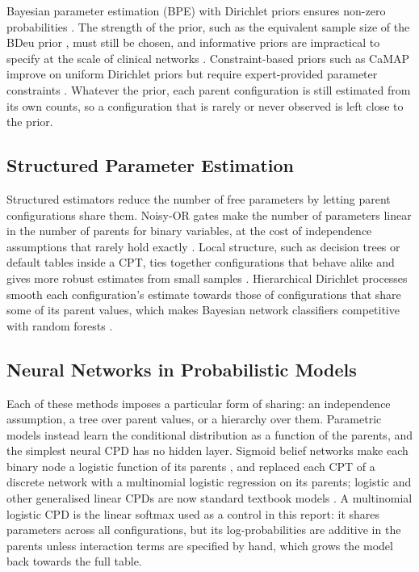 \documentclass[a4paper,fleqn]{cas-dc}
\begin{document}
Bayesian parameter estimation (BPE) with Dirichlet priors ensures non-zero probabilities \citep[Secs.~17.3--17.4]{koller2009probabilistic}. The strength of the prior, such as the equivalent sample size of the BDeu prior \citep{heckerman1995learning}, must still be chosen, and informative priors are impractical to specify at the scale of clinical networks \citep{comprehensive_kyrimi_2021}. Constraint-based priors such as CaMAP improve on uniform Dirichlet priors but require expert-provided parameter constraints \citep{constrained_di_2021}. Whatever the prior, each parent configuration is still estimated from its own counts, so a configuration that is rarely or never observed is left close to the prior.

\subsection{Structured Parameter Estimation}

Structured estimators reduce the number of free parameters by letting parent configurations share them. Noisy-OR gates make the number of parameters linear in the number of parents for binary variables, at the cost of independence assumptions that rarely hold exactly \citep{learning_oniko_2001}. Local structure, such as decision trees or default tables inside a CPT, ties together configurations that behave alike and gives more robust estimates from small samples \citep{friedman1996learning}. Hierarchical Dirichlet processes smooth each configuration's estimate towards those of configurations that share some of its parent values, which makes Bayesian network classifiers competitive with random forests \citep{petitjean2018accurate}.

\subsection{Neural Networks in Probabilistic Models}

Each of these methods imposes a particular form of sharing: an independence assumption, a tree over parent values, or a hierarchy over them. Parametric models instead learn the conditional distribution as a function of the parents, and the simplest neural CPD has no hidden layer. Sigmoid belief networks make each binary node a logistic function of its parents \citep{neal1992connectionist}, and \citet{rijmen2008bayesian} replaced each CPT of a discrete network with a multinomial logistic regression on its parents; logistic and other generalised linear CPDs are now standard textbook models \citep[Ch.~5]{koller2009probabilistic}. A multinomial logistic CPD is the linear softmax used as a control in this report: it shares parameters across all configurations, but its log-probabilities are additive in the parents unless interaction terms are specified by hand, which grows the model back towards the full table.
\end{document}
